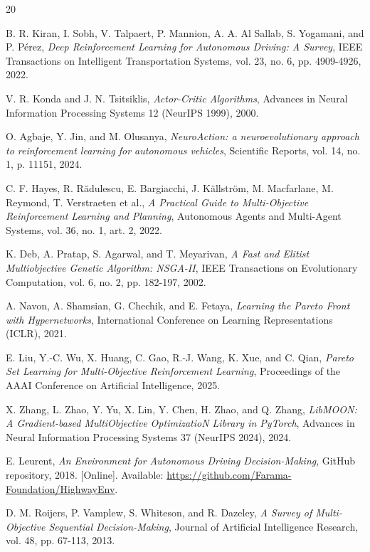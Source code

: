 \documentclass[12pt, letterpaper]{article}
\begin{document}
\begin{thebibliography}{20}

B. R. Kiran, I. Sobh, V. Talpaert, P. Mannion, A. A. Al Sallab, S. Yogamani, and P. Pérez,
\textit{Deep Reinforcement Learning for Autonomous Driving: A Survey},
IEEE Transactions on Intelligent Transportation Systems, vol. 23, no. 6, pp. 4909-4926, 2022.

V. R. Konda and J. N. Tsitsiklis,
\textit{Actor-Critic Algorithms},
Advances in Neural Information Processing Systems 12 (NeurIPS 1999), 2000.

O. Agbaje, Y. Jin, and M. Olusanya,
\textit{NeuroAction: a neuroevolutionary approach to reinforcement learning for autonomous vehicles},
Scientific Reports, vol. 14, no. 1, p. 11151, 2024.

C. F. Hayes, R. Rădulescu, E. Bargiacchi, J. Källström, M. Macfarlane, M. Reymond, T. Verstraeten et al.,
\textit{A Practical Guide to Multi-Objective Reinforcement Learning and Planning},
Autonomous Agents and Multi-Agent Systems, vol. 36, no. 1, art. 2, 2022.

K. Deb, A. Pratap, S. Agarwal, and T. Meyarivan,
\textit{A Fast and Elitist Multiobjective Genetic Algorithm: NSGA-II},
IEEE Transactions on Evolutionary Computation, vol. 6, no. 2, pp. 182-197, 2002.

A. Navon, A. Shamsian, G. Chechik, and E. Fetaya,
\textit{Learning the Pareto Front with Hypernetworks},
International Conference on Learning Representations (ICLR), 2021.

E. Liu, Y.-C. Wu, X. Huang, C. Gao, R.-J. Wang, K. Xue, and C. Qian,
\textit{Pareto Set Learning for Multi-Objective Reinforcement Learning},
Proceedings of the AAAI Conference on Artificial Intelligence, 2025.

X. Zhang, L. Zhao, Y. Yu, X. Lin, Y. Chen, H. Zhao, and Q. Zhang,
\textit{LibMOON: A Gradient-based MultiObjective OptimizatioN Library in PyTorch},
Advances in Neural Information Processing Systems 37 (NeurIPS 2024), 2024.

E. Leurent,
\textit{An Environment for Autonomous Driving Decision-Making},
GitHub repository, 2018. [Online]. Available: \url{https://github.com/Farama-Foundation/HighwayEnv}.

D. M. Roijers, P. Vamplew, S. Whiteson, and R. Dazeley,
\textit{A Survey of Multi-Objective Sequential Decision-Making},
Journal of Artificial Intelligence Research, vol. 48, pp. 67-113, 2013.


\end{thebibliography}
\end{document}
